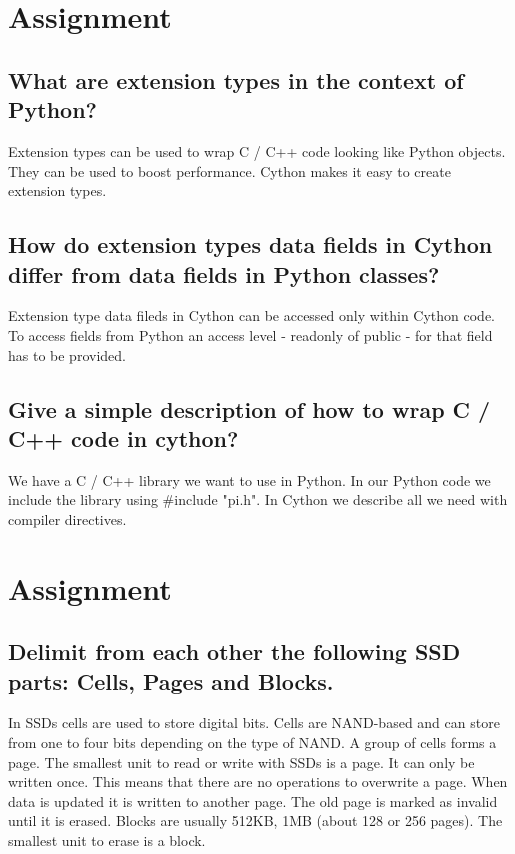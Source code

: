 \documentclass[runningheads]{llncs}
\begin{document}
\section{Assignment}

\subsection{What are extension types in the context of Python?}
Extension types can be used to wrap C / C++ code looking like Python objects.
They can be used to boost performance. Cython makes it easy to create extension types.

\subsection{How do extension types data fields in Cython differ from data fields in Python classes?}
Extension type data fileds in Cython can be accessed only within Cython code.
To access fields from Python an access level - readonly of public - for that field has to be provided.

\subsection{Give a simple description of how to wrap C / C++ code in cython?}
We have a C / C++ library we want to use in Python. 
In our Python code we include the library using \#include "pi.h".
In Cython we describe all we need with compiler directives.


\section{Assignment}

\subsection{Delimit from each other the following SSD parts: Cells, Pages and Blocks.}
In SSDs cells are used to store digital bits. 
Cells are NAND-based and can store from one to four bits depending on the type of NAND.
A group of cells forms a page. The smallest unit to read or write with SSDs is a page.
It can only be written once. This means that there are no operations to overwrite a page.
When data is updated it is written to another page. 
The old page is marked as invalid until it is erased.
Blocks are usually 512KB, 1MB (about 128 or 256 pages). The smallest unit to erase is a block.
\end{document}
